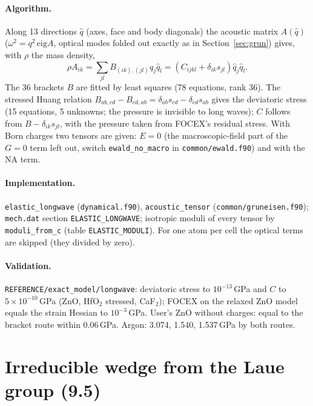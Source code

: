\documentclass[11pt,a4paper]{article}
\newcommand{\code}[1]{\texttt{#1}}
\begin{document}
\paragraph{Algorithm.} Along 13 directions $\hat q$ (axes, face and body diagonals) the acoustic matrix
$A(\hat q)$ ($\omega^2=q^2\,\mathrm{eig}A$, optical modes folded out exactly as in Section~\ref{sec:grun})
gives, with $\rho$ the mass density,
\begin{equation}
\rho A_{ik}=\sum_{jl}B_{(ik),(jl)}\hat q_j\hat q_l=(C_{ijkl}+\delta_{ik}s_{jl})\hat q_j\hat q_l .
\end{equation}
The 36 brackets $B$ are fitted by least squares (78 equations, rank 36). The stressed Huang relation
$B_{ab,cd}-B_{cd,ab}=\delta_{ab}s_{cd}-\delta_{cd}s_{ab}$ gives the deviatoric stress (15 equations, 5
unknowns; the pressure is invisible to long waves); $C$ follows from $B-\delta_{ik}s_{jl}$, with the
pressure taken from FOCEX's residual stress. With Born charges two tensors are given: $E=0$ (the
macroscopic-field part of the $G=0$ term left out, switch \code{ewald\_no\_macro} in \code{common/ewald.f90})
and with the NA term.

\paragraph{Implementation.} \code{elastic\_longwave} (\code{dynamical.f90}), \code{acoustic\_tensor}
(\code{common/gruneisen.f90}); \code{mech.dat} section \code{ELASTIC\_LONGWAVE}; isotropic moduli of every
tensor by \code{moduli\_from\_c} (table \code{ELASTIC\_MODULI}). For one atom per cell the optical terms are
skipped (they divided by zero).

\paragraph{Validation.} \code{REFERENCE/exact\_model/longwave}: deviatoric stress to $10^{-13}$\,GPa and $C$ to
$5\times10^{-10}$\,GPa (ZnO, HfO$_2$ stressed, CaF$_2$); FOCEX on the relaxed ZnO model equals the strain
Hessian to $10^{-3}$\,GPa. User's ZnO without charges: equal to the bracket route within 0.06\,GPa. Argon:
3.074, 1.540, 1.537\,GPa by both routes.

\section{Irreducible wedge from the Laue group (9.5)}
\end{document}
